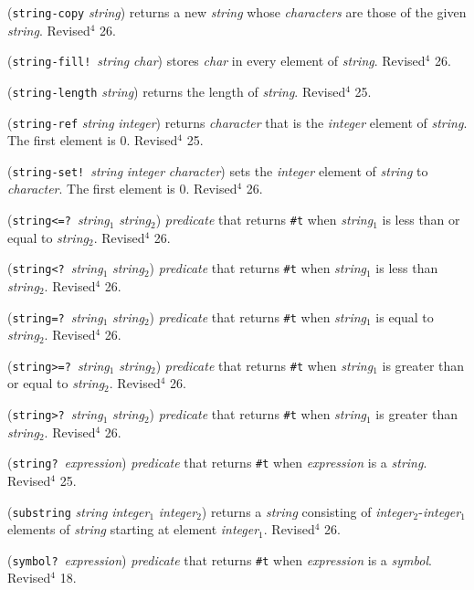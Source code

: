 \documentclass[10pt,twocolumn]{article}
\begin{document}
(\texttt{string-copy} \emph{string}) returns a new \emph{string} whose
\emph{characters} are those of the given \emph{string}.  Revised$^4$ 26.

(\texttt{string-fill!}\ \emph{string} \emph{char}) stores \emph{char} in
every element of \emph{string}.  Revised$^4$ 26.

(\texttt{string-length} \emph{string}) returns the length of \emph{string}.
Revised$^4$ 25.

(\texttt{string-ref} \emph{string} \emph{integer}) returns \emph{character} that
is the \emph{integer} element of \emph{string}.  The first element is
0. Revised$^4$ 25.

(\texttt{string-set!}\ \emph{string} \emph{integer} \emph{character}) sets the
\emph{integer} element of \emph{string} to \emph{character}.  The first
element is 0.  Revised$^4$ 26.

(\texttt{string<=?}\ \emph{string}$_1$ \emph{string}$_2$) \emph{predicate} that
returns \texttt{\#t} when \emph{string}$_1$ is less than or equal to
\emph{string}$_2$.  Revised$^4$ 26.

(\texttt{string<?}\ \emph{string}$_1$ \emph{string}$_2$) \emph{predicate} that
returns \texttt{\#t} when \emph{string}$_1$ is less than \emph{string}$_2$.
Revised$^4$ 26.

(\texttt{string=?}\ \emph{string}$_1$ \emph{string}$_2$) \emph{predicate} that
returns \texttt{\#t} when \emph{string}$_1$ is equal to \emph{string}$_2$.
Revised$^4$ 26.

(\texttt{string>=?}\ \emph{string}$_1$ \emph{string}$_2$) \emph{predicate} that
returns \texttt{\#t} when \emph{string}$_1$ is greater than or equal to
\emph{string}$_2$.  Revised$^4$ 26.

(\texttt{string>?}\ \emph{string}$_1$ \emph{string}$_2$) \emph{predicate} that
returns \texttt{\#t} when \emph{string}$_1$ is greater than \emph{string}$_2$.
Revised$^4$ 26.

(\texttt{string?}\ \emph{expression}) \emph{predicate} that returns \texttt{\#t} when
\emph{expression} is a \emph{string}.  Revised$^4$ 25.

(\texttt{substring} \emph{string} \emph{integer}$_1$ \emph{integer}$_2$) returns
a \emph{string} consisting of \emph{integer}$_2$-\emph{integer}$_1$ elements
of \emph{string} starting at element \emph{integer}$_1$.  Revised$^4$ 26.

(\texttt{symbol?}\ \emph{expression}) \emph{predicate} that returns \texttt{\#t} when
\emph{expression} is a \emph{symbol}.  Revised$^4$ 18.
\end{document}
